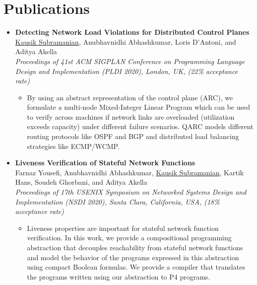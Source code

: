 \documentclass[11pt,a4paper,sans]{moderncv}        %
\begin{document}
\vspace*{1pt}

\section{Publications}
\begin{itemize}
	\item \textbf{Detecting Network Load Violations for Distributed Control Planes} \\
	\underline{Kausik Subramanian}, Anubhavnidhi Abhashkumar, Loris D’Antoni, and Aditya Akella \\
	\emph{Proceedings of 41st ACM SIGPLAN Conference on Programming Language Design and Implementation (PLDI 2020), London, UK, (22\% acceptance rate)}
	\begin{itemize}
		\item By using an abstract representation of the control plane (ARC), we
		formulate a multi-node Mixed-Integer Linear Program which can be used to
		verify across machines if network links are overloaded (utilization
		exceeds capacity) under different failure scenarios. QARC models
		different routing protocols like OSPF and BGP and distributed load
		balancing strategies like ECMP/WCMP.
	\end{itemize}
	\vspace*{4mm}

	\item \textbf{Liveness Verification of Stateful Network Functions} \\
	Farnaz Yousefi, Anubhavnidhi Abhashkumar, \underline{Kausik Subramanian}, Kartik Hans, Soudeh Ghorbani, and Aditya Akella \\
	\emph{Proceedings of 17th USENIX Symposium on Networked Systems Design and Implementation (NSDI 2020), Santa Clara, California, USA, (18\% acceptance rate)}
	\begin{itemize}
		\item Liveness properties are important for stateful network function verification.
		In this work, we provide a compositional programming abstraction that decouples
		reachability from stateful network functions and model the behavior of the
		programs expressed in
		this abstraction using compact Boolean formulas.
		We provide a compiler that translates the
		programs written using our abstraction to P4 programs.
	\end{itemize}
	\vspace*{4mm}


\end{itemize}
\end{document}
